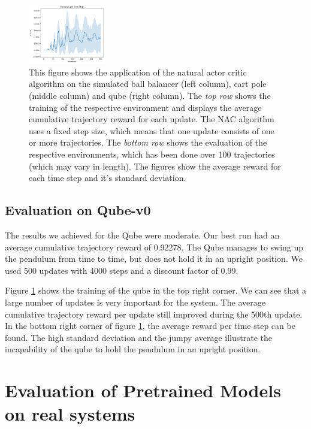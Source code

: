 \begin{figure}
\begin{center}
		\hspace{1mm}
		\includegraphics[width=0.3\textwidth]{plots/NAC_Qube_time_step_reward.png}
		\hspace{1.5mm}
		\caption{This figure shows the application of the natural actor critic algorithm on the simulated ball balancer (left column), cart pole (middle column) and qube (right column). The \textit{top row} shows the training of the respective environment and displays the average cumulative trajectory reward for each update. The NAC algorithm uses a fixed step size, which means that one update consists of one or more trajectories. The\textit{ bottom row} shows the evaluation of the respective environments, which has been done over 100 trajectories (which may vary in length). The figures show the average reward for each time step and it's standard deviation.}
		\label{fig:nac}
	\end{center}
\end{figure}

\subsection{Evaluation on Qube-v0}

The results we achieved for the Qube were moderate. Our best run had an average cumulative trajectory reward of 0.92278. The Qube manages to swing up the pendulum from time to time, but does not hold it in an upright position. We used 500 updates with 4000 steps and a discount factor of 0.99. 

Figure \ref{fig:nac} shows the training of the qube in the top right corner. We can see that a large number of updates is very important for the system. The average cumulative trajectory reward per update still improved during the 500th update. In the bottom right corner of figure \ref{fig:nac}, the average reward per time step can be found. The high standard deviation and the jumpy average illustrate the incapability of the qube to hold the pendulum in an upright position.



\section{Evaluation of Pretrained Models on real systems}

